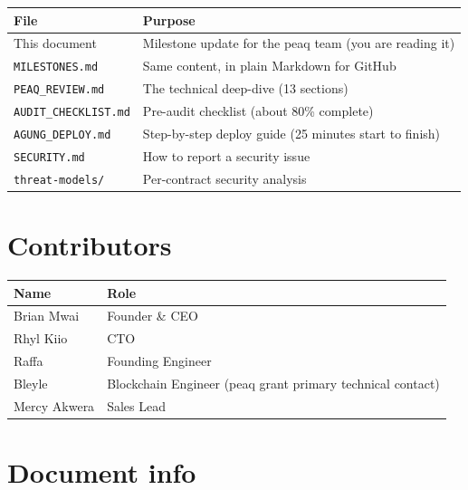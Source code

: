 \documentclass[11pt,a4paper]{article}
\begin{document}
\begin{center}
\begin{tabular}{p{5cm} p{10.5cm}}
\toprule
{\bfseries\color{axiprimary}File} & {\bfseries\color{axiprimary}Purpose} \\
\midrule
This document & Milestone update for the peaq team (you are reading it) \\
\texttt{MILESTONES.md} & Same content, in plain Markdown for GitHub \\
\texttt{PEAQ\_REVIEW.md} & The technical deep-dive (13 sections) \\
\texttt{AUDIT\_CHECKLIST.md} & Pre-audit checklist (about 80\% complete) \\
\texttt{AGUNG\_DEPLOY.md} & Step-by-step deploy guide (25 minutes start to finish) \\
\texttt{SECURITY.md} & How to report a security issue \\
\texttt{threat-models/} & Per-contract security analysis \\
\bottomrule
\end{tabular}
\end{center}

\section{Contributors}

\begin{center}
\begin{tabular}{p{4cm} p{11.5cm}}
\toprule
{\bfseries\color{axiprimary}Name} & {\bfseries\color{axiprimary}Role} \\
\midrule
Brian Mwai & Founder \& CEO \\
Rhyl Kiio & CTO \\
Raffa & Founding Engineer \\
Bleyle & Blockchain Engineer (peaq grant primary technical contact) \\
Mercy Akwera & Sales Lead \\
\bottomrule
\end{tabular}
\end{center}

\newpage
\section*{\color{axiprimary}Document info}
\end{document}
